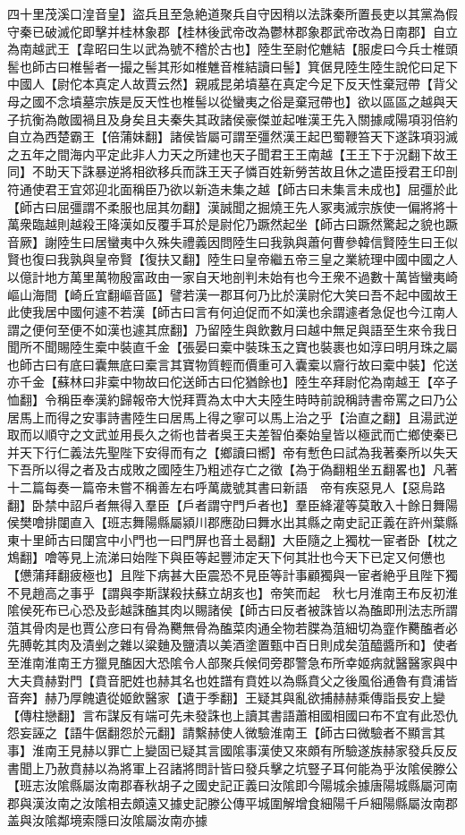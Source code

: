 四十里茂溪口湟音皇】盜兵且至急絶道聚兵自守因稍以法誅秦所置長吏以其黨為假守秦已破滅佗即擊并桂林象郡【桂林後武帝改為鬱林郡象郡武帝改為日南郡】自立為南越武王【韋昭曰生以武為號不稽於古也】陸生至尉佗魋結【服䖍曰今兵士椎頭䯻也師古曰椎髻者一撮之髻其形如椎魋音椎結讀曰髻】箕倨見陸生陸生說佗曰足下中國人【尉佗本真定人故賈云然】親戚昆弟墳墓在真定今足下反天性棄冠帶【背父母之國不念墳墓宗族是反天性也椎髻以從蠻夷之俗是棄冠帶也】欲以區區之越與天子抗衡為敵國禍且及身矣且夫秦失其政諸侯豪傑並起唯漢王先入關據咸陽項羽倍約自立為西楚霸王【倍蒲妹翻】諸侯皆屬可謂至彊然漢王起巴蜀鞭笞天下遂誅項羽滅之五年之間海内平定此非人力天之所建也天子聞君王王南越【王王下于況翻下故王同】不助天下誅暴逆將相欲移兵而誅王天子憐百姓新勞苦故且休之遣臣授君王印剖符通使君王宜郊迎北面稱臣乃欲以新造未集之越【師古曰未集言未成也】屈彊於此【師古曰屈彊謂不柔服也屈其勿翻】漢誠聞之掘燒王先人冢夷滅宗族使一偏將將十萬衆臨越則越殺王降漢如反覆手耳於是尉佗乃蹶然起坐【師古曰蹶然驚起之貌也蹶音厥】謝陸生曰居蠻夷中久殊失禮義因問陸生曰我孰與蕭何曹參韓信賢陸生曰王似賢也復曰我孰與皇帝賢【復扶又翻】陸生曰皇帝繼五帝三皇之業統理中國中國之人以億計地方萬里萬物殷富政由一家自天地剖判未始有也今王衆不過數十萬皆蠻夷崎嶇山海間【崎丘宜翻嶇音區】譬若漢一郡耳何乃比於漢尉佗大笑曰吾不起中國故王此使我居中國何遽不若漢【師古曰言有何迫促而不如漢也余謂遽者急促也今江南人謂之便何至便不如漢也遽其庶翻】乃留陸生與飲數月曰越中無足與語至生來令我日聞所不聞賜陸生槖中裝直千金【張晏曰槖中裝珠玉之寶也裝裹也如淳曰明月珠之屬也師古曰有底曰囊無底曰槖言其寶物質輕而價重可入囊槖以齎行故曰槖中裝】佗送亦千金【蘇林曰非槖中物故曰佗送師古曰佗猶餘也】陸生卒拜尉佗為南越王【卒子恤翻】令稱臣奉漢約歸報帝大悦拜賈為太中大夫陸生時時前說稱詩書帝罵之曰乃公居馬上而得之安事詩書陸生曰居馬上得之寧可以馬上治之乎【治直之翻】且湯武逆取而以順守之文武並用長久之術也昔者吳王夫差智伯秦始皇皆以極武而亡鄉使秦已并天下行仁義法先聖陛下安得而有之【鄉讀曰嚮】帝有慙色曰試為我著秦所以失天下吾所以得之者及古成敗之國陸生乃粗述存亡之徵【為于偽翻粗坐五翻畧也】凡著十二篇每奏一篇帝未嘗不稱善左右呼萬歲號其書曰新語　帝有疾惡見人【惡烏路翻】卧禁中詔戶者無得入羣臣【戶者謂守門戶者也】羣臣絳灌等莫敢入十餘日舞陽侯樊噲排闥直入【班志舞陽縣屬潁川郡應劭曰舞水出其縣之南史記正義在許州葉縣東十里師古曰闥宫中小門也一曰門屏也音土曷翻】大臣隨之上獨枕一宦者卧【枕之鴆翻】噲等見上流涕曰始陛下與臣等起豐沛定天下何其壯也今天下已定又何憊也【憊蒲拜翻疲極也】且陛下病甚大臣震恐不見臣等計事顧獨與一宦者絶乎且陛下獨不見趙高之事乎【謂與李斯謀殺扶蘇立胡亥也】帝笑而起　秋七月淮南王布反初淮隂侯死布已心恐及彭越誅醢其肉以賜諸侯【師古曰反者被誅皆以為醢即刑法志所謂菹其骨肉是也賈公彦曰有骨為臡無骨為醢菜肉通全物若䐑為菹細切為韲作臡醢者必先膊乾其肉及漬剉之雜以粱麯及鹽漬以美酒塗置甄中百日則成矣菹醯醬所和】使者至淮南淮南王方獵見醢因大恐隂令人部聚兵候伺旁郡警急布所幸姬病就醫醫家與中大夫賁赫對門【賁音肥姓也赫其名也姓譜有賁姓以為縣賁父之後風俗通魯有賁浦皆音奔】赫乃厚餽遺從姬飲醫家【遺于季翻】王疑其與亂欲捕赫赫乘傳詣長安上變【傳柱戀翻】言布謀反有端可先未發誅也上讀其書語蕭相國相國曰布不宜有此恐仇怨妄誣之【語牛倨翻怨於元翻】請繫赫使人微驗淮南王【師古曰微驗者不顯言其事】淮南王見赫以罪亡上變固已疑其言國隂事漢使又來頗有所驗遂族赫家發兵反反書聞上乃赦賁赫以為將軍上召諸將問計皆曰發兵擊之坑豎子耳何能為乎汝隂侯滕公【班志汝隂縣屬汝南郡春秋胡子之國史記正義曰汝隂即今陽城余據唐陽城縣屬河南郡與漢汝南之汝隂相去頗遠又據史記滕公傳平城圍解增食細陽千戶細陽縣屬汝南郡盖與汝隂鄰境索隱曰汝隂屬汝南亦據